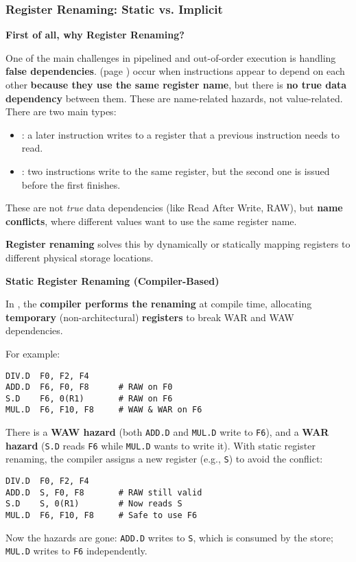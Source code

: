 \subsubsection{Register Renaming: Static vs. Implicit}

\begin{flushleft}
    \textcolor{Green3}{ \textbf{First of all, why Register Renaming?}}
\end{flushleft}
One of the main challenges in pipelined and out-of-order execution is handling \textbf{false dependencies}.  (page \pageref{subsubsection: Name Dependencies}) occur when instructions appear to depend on each other \textbf{because they use the same register name}, but there is \textbf{no true data dependency} between them. These are name-related hazards, not value-related. There are two main types:
\begin{itemize}
    \item {}: a later instruction writes to a register that a previous instruction needs to read.
    \item {}: two instructions write to the same register, but the second one is issued before the first finishes.
\end{itemize}
These are not \emph{true} data dependencies (like Read After Write, RAW), but \textbf{name conflicts}, where different values want to use the same register name.

\highspace
\textcolor{Green3}{ \textbf{Register renaming}} solves this by dynamically or statically mapping registers to different physical storage locations.

\highspace
\begin{flushleft}
    \textcolor{Red2}{ \textbf{Static Register Renaming (Compiler-Based)}}
\end{flushleft}
In , the \textbf{compiler performs the renaming} at compile time, allocating \textbf{temporary} (non-architectural) \textbf{registers} to break WAR and WAW dependencies.

\highspace
For example:
\begin{lstlisting}[language=unknown]
DIV.D  F0, F2, F4
ADD.D  F6, F0, F8      # RAW on F0
S.D    F6, 0(R1)       # RAW on F6
MUL.D  F6, F10, F8     # WAW & WAR on F6
\end{lstlisting}
There is a \textbf{WAW hazard} (both \texttt{ADD.D} and \texttt{MUL.D} write to \texttt{F6}), and a \textbf{WAR hazard} (\texttt{S.D} reads \texttt{F6} while \texttt{MUL.D} wants to write it). With static register renaming, the compiler assigns a new register (e.g., \texttt{S}) to avoid the conflict:
\begin{lstlisting}[language=unknown]
DIV.D  F0, F2, F4
ADD.D  S, F0, F8       # RAW still valid
S.D    S, 0(R1)        # Now reads S
MUL.D  F6, F10, F8     # Safe to use F6
\end{lstlisting}
Now the hazards are gone: \texttt{ADD.D} writes to \texttt{S}, which is consumed by the store; \texttt{MUL.D} writes to \texttt{F6} independently.

